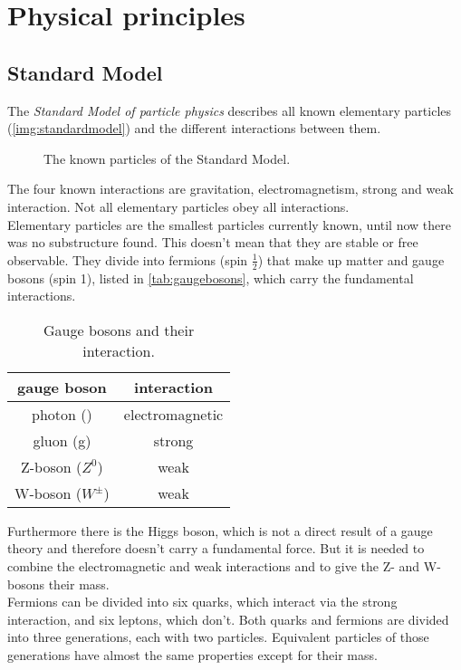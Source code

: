 \section{Physical principles}
\subsection{Standard Model}
The \emph{Standard Model of particle physics} describes all known elementary particles (\autoref{img:standardmodel}) and the different 
interactions between them.
\begin{figure}[H]
        \centering
        \def\svgwidth{0.55\textwidth}
       
        \caption{The known particles of the Standard Model.}
        \label{img:standardmodel}
\end{figure}
The four known interactions are gravitation, electromagnetism, strong and weak interaction. Not all elementary particles obey all interactions.\\
Elementary particles are the smallest particles currently known, until now there was no substructure found. 
This doesn't mean that they are stable or free observable. They divide into fermions (spin $\frac{1}{2}$) that make up matter and 
gauge bosons (spin 1), listed in \autoref{tab:gaugebosons}, which carry the fundamental interactions. 
\begin{table}[H]
\caption{Gauge bosons and their interaction.}
\begin{center}
\begin{tabular}{|c|c|}
	\hline
	gauge boson 		& interaction			\\ \hline \hline
	photon (\textgamma) & electromagnetic 		\\ \hline
	gluon (g) 			& strong				\\ \hline
	Z-boson ($Z^0$)		& weak					\\ \hline
	W-boson ($W^\pm$)	& weak					\\ \hline
\end{tabular}
\end{center}
\label{tab:gaugebosons}
\end{table}
Furthermore there is the Higgs boson, which is not a direct result of a gauge theory and 
therefore doesn't carry a fundamental force. But it is needed to combine the electromagnetic and weak interactions and to give the Z- and W-bosons
their mass. \\
Fermions can be divided into six quarks, which interact via the strong interaction, and six leptons, which don't. Both quarks and fermions are 
divided into three generations, each with two particles. Equivalent particles of those generations have almost the same properties except for 
their mass.
